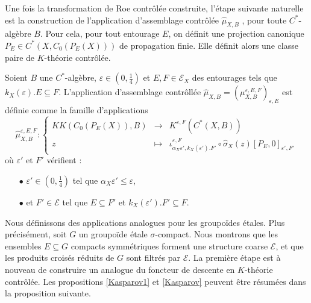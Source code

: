 Une fois la transformation de Roe contrôlée construite, l'étape suivante naturelle est la construction de l'application d'assemblage contrôlée $\hat\mu_{X,B}$ , pour toute $C^*$-algèbre $B$. Pour cela, pour tout entourage $E$, on définit une projection canonique $P_E\in C^*(X,C_0(P_E(X)))$ de propagation finie. Elle définit alors une classe paire de $K$-théorie contrôlée.

\begin{definitionfr}
Soient $B$ une $C^*$-algèbre, $\varepsilon\in (0,\frac{1}{4})$ et $E,F\in\mathcal E_X$ des entourages tels que $k_X(\varepsilon).E\subseteq F$. L'application d'assemblage contrôllée $\hat\mu_{X,B}=(\mu_{X,B}^{\varepsilon,E,F})_{\varepsilon,E}$ est définie comme la famille d'applications
\[\hat\mu_{X,B}^{\varepsilon, E,F} :\left\{\begin{array}{rcl} KK(C_0(P_E(X)),B) & \rightarrow & K^{\varepsilon, F}(C^*(X,B)) \\
					z & \mapsto & \iota_{\alpha_X \varepsilon',k_X(\varepsilon').F'}^{\varepsilon,F}\circ\hat\sigma_X(z)[P_{E},0]_{\varepsilon', F'}\end{array}\right.\]
où $\varepsilon'$ et $F'$ vérifient :
\begin{itemize}
\item[$\bullet$] $\varepsilon'\in (0,\frac{1}{4})$ tel que $\alpha_X \varepsilon'\leq \varepsilon$,
\item[$\bullet$] et $F'\in\mathcal E$ tel que $E\subseteq F'$ et $k_X(\varepsilon').F'\subseteq F$.
\end{itemize}
\end{definitionfr}

Nous définissons des applications analogues pour les groupoïdes étales. Plus précisément, soit $G$ un groupoïde étale $\sigma$-compact. Nous montrons que les ensembles $E\subseteq G$ compacts symmétriques forment une structure coarse $\mathcal E$, et que les produits croisés réduits de $G$ sont filtrés par $\mathcal E$. La première étape est à nouveau de construire un analogue du foncteur de descente en $K$-théorie contrôlée. Les propositions \ref{Kasparov1} et \ref{Kasparov} peuvent être résumées dans la proposition suivante. 

